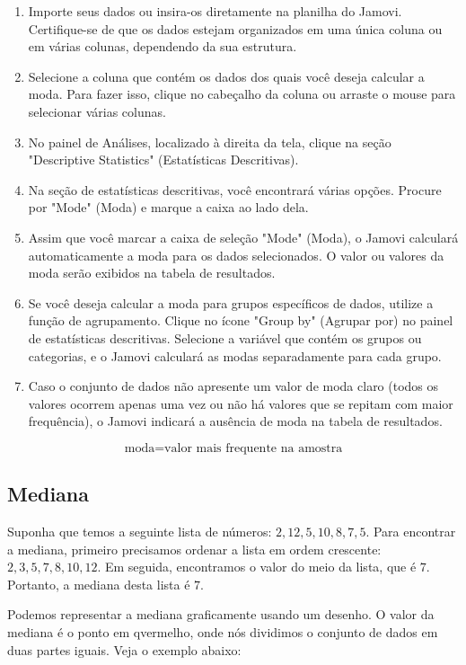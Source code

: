 \begin{enumerate}
    \item Importe seus dados ou insira-os diretamente na planilha do Jamovi. Certifique-se de que os dados estejam organizados em uma única coluna ou em várias colunas, dependendo da sua estrutura.
    \item Selecione a coluna que contém os dados dos quais você deseja calcular a moda. Para fazer isso, clique no cabeçalho da coluna ou arraste o mouse para selecionar várias colunas.
    \item No painel de Análises, localizado à direita da tela, clique na seção "Descriptive Statistics" (Estatísticas Descritivas).
    \item Na seção de estatísticas descritivas, você encontrará várias opções. Procure por "Mode" (Moda) e marque a caixa ao lado dela.
    \item Assim que você marcar a caixa de seleção "Mode" (Moda), o Jamovi calculará automaticamente a moda para os dados selecionados. O valor ou valores da moda serão exibidos na tabela de resultados.
    \item Se você deseja calcular a moda para grupos específicos de dados, utilize a função de agrupamento. Clique no ícone "Group by" (Agrupar por) no painel de estatísticas descritivas. Selecione a variável que contém os grupos ou categorias, e o Jamovi calculará as modas separadamente para cada grupo.
    \item Caso o conjunto de dados não apresente um valor de moda claro (todos os valores ocorrem apenas uma vez ou não há valores que se repitam com maior frequência), o Jamovi indicará a ausência de moda na tabela de resultados.
\end{enumerate}

\[
\text{moda} = \text{valor mais frequente na amostra}
\]

\subsection{Mediana}

Suponha que temos a seguinte lista de números: $2, 12, 5, 10, 8, 7, 5$. Para encontrar a mediana, primeiro precisamos ordenar a lista em ordem crescente: $2, 3, 5, 7, 8, 10, 12$. Em seguida, encontramos o valor do meio da lista, que é $7$. Portanto, a mediana desta lista é $7$.

Podemos representar a mediana graficamente usando um desenho. O valor da mediana é o ponto em qvermelho, onde nós dividimos o conjunto de dados em duas partes iguais. Veja o exemplo abaixo:

